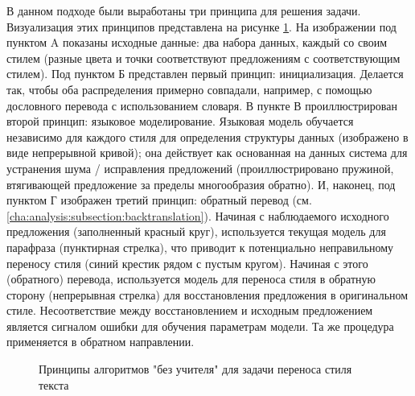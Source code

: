 В данном подходе были выработаны три принципа для решения задачи.
Визуализация этих принципов представлена на рисунке \ref{fig:lample_principles}.
На изображении под пунктом A показаны исходные данные: два набора данных, каждый со своим стилем (разные цвета и точки соответствуют предложениям с соответствующим стилем).
Под пунктом Б представлен первый принцип: инициализация. Делается так, чтобы оба распределения примерно совпадали, например, с помощью дословного перевода с использованием словаря.
В пункте В проиллюстрирован второй принцип: языковое моделирование. Языковая модель обучается независимо для каждого стиля для определения структуры данных (изображено в виде непрерывной кривой); она действует как основанная на данных система для устранения шума / исправления предложений (проиллюстрировано пружиной, втягивающей предложение за пределы многообразия обратно).
И, наконец, под пунктом Г изображен третий принцип: обратный перевод (см. \ref{cha:analysis:subsection:backtranslation}).
Начиная с наблюдаемого исходного предложения (заполненный красный круг), используется текущая модель для парафраза (пунктирная стрелка), что приводит к потенциально неправильному переносу стиля (синий крестик рядом с пустым кругом).
Начиная с этого (обратного) перевода, используется модель для переноса стиля в обратную сторону (непрерывная стрелка) для восстановления предложения в оригинальном стиле.
Несоответствие между восстановлением и исходным предложением является сигналом ошибки для обучения параметрам модели.
    Та же процедура применяется в обратном направлении.
\begin{figure}[ht]
  \centering
  \caption{Принципы алгоритмов "без учителя" для задачи переноса стиля текста}
  \label{fig:lample_principles}
\end{figure}


